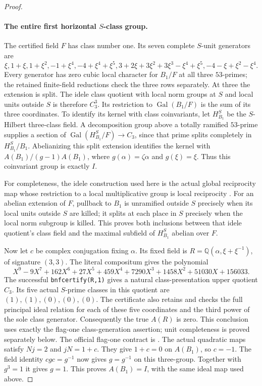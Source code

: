 \begin{proof}
\paragraph{The entire first horizontal $S$-class group.}
The certified field $F$ has class number one. Its seven
complete $S$-unit generators are
\[
 \xi, 1+\xi, 1+\xi^2, -1+\xi^4,
 -4+\xi^4+\xi^5,
 3+2\xi+3\xi^2+3\xi^3-\xi^4+\xi^5,
 -4-\xi+\xi^2-\xi^4.
 \tag{E119.9}
\]
Every generator has zero cubic local character for $B_1/F$
at all three $53$-primes; the retained finite-field reductions
check the three rows separately. At three the extension is split.
The idele class quotient with local norm groups at $S$ and local
units outside $S$ is therefore $C_3^3$. Its restriction to
$\operatorname{Gal}(B_1/F)$ is the sum of its three coordinates.
To identify its kernel with class coinvariants, let
$H^S_{B_1}$ be the $S$-Hilbert three-class field. A decomposition
group above a totally ramified $53$-prime supplies a section of
$\operatorname{Gal}(H^S_{B_1}/F)\to C_3$, since that prime
splits completely in $H^S_{B_1}/B_1$.
Abelianizing this split extension identifies the kernel with
$A(B_1)/(g-1)A(B_1)$, where
$g(\alpha)=\zeta\alpha$ and $g(\xi)=\xi$.
Thus this coinvariant group is exactly $I$.

For completeness, the idele construction used here is the actual
global reciprocity map whose restriction to a local multiplicative
group is local reciprocity
\cite[V,Proposition5.2 and Theorems5.3 and5.5]{E_MilneCFT}.
For an abelian extension of $F$, pullback to $B_1$ is unramified
outside $S$ precisely when its local units outside $S$ are killed;
it splits at each place in $S$ precisely when the local norm
subgroup is killed. This proves both inclusions between that
idele quotient's class field and the maximal subfield of
$H^S_{B_1}$ abelian over $F$.

Now let $c$ be complex conjugation fixing $\alpha$.
Its fixed field is
$R=\mathbb Q(\alpha,\xi+\xi^{-1})$, of signature $(3,3)$.
The literal compositum gives the polynomial
\[
 X^9-9X^7+162X^6+27X^5+459X^4+7290X^3
       +1458X^2+51030X+156033.
 \tag{E119.10}
\]
The successful \texttt{bnfcertify(R,1)} gives a natural
class-presentation upper quotient $C_3$. Its five actual
$S$-prime classes in this quotient are $(1),(1),(0),(0),(0)$.
The certificate also retains and checks the full principal
ideal relation for each of these five coordinates and the
third power of the sole class generator.
Consequently the true $A(R)$ is zero. This conclusion uses exactly
the flag-one class-generation assertion; unit completeness is
proved separately below. The official flag-one contract is
\cite[\texttt{bnfcertify}, flag1]{E_PARICertifiedUnits}.
The actual quadratic maps satisfy $Nj=2$ and $jN=1+c$.
They give $1+c=0$ on $A(B_1)$, so $c=-1$.
The field identity $cgc=g^{-1}$ now gives $g=g^{-1}$ on this
three-group. Together with $g^3=1$ it gives $g=1$.
This proves $A(B_1)=I$, with the same ideal map used above.


\end{proof}
